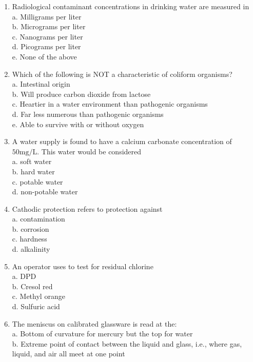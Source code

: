 \begin{enumerate}[1.]
\item Radiological contaminant concentrations in drinking water are measured in\\
a. Milligrams per liter\\
b. Micrograms per liter\\
c. Nanograms per liter\\
d. Picograms per liter\\
e. None of the above\\
\item Which of the following is NOT a characteristic of coliform organisms?\\
a. Intestinal origin\\
b. Will produce carbon dioxide from lactose\\
c. Heartier in a water environment than pathogenic organisms\\
d. Far less numerous than pathogenic organisms\\
e. Able to survive with or without oxygen\\
\item A water supply is found to have a calcium carbonate concentration of $50 \mathrm{mg} / \mathrm{L}$. This water would be considered\\
a. soft water\\
b. hard water\\
c. potable water\\
d. non-potable water\\
\item Cathodic protection refers to protection against\\
a. contamination\\
b. corrosion\\
c. hardness\\
d. alkalinity\\
\item An operator uses to test for residual chlorine\\
a. DPD\\
b. Cresol red\\
c. Methyl orange\\
d. Sulfuric acid\\
\item The meniscus on calibrated glassware is read at the:\\
a. Bottom of curvature for mercury but the top for water\\
b. Extreme point of contact between the liquid and glass, i.e., where gas, liquid, and air all meet at one point\\

\end{enumerate}
